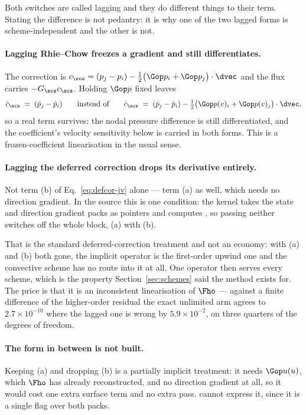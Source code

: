 Both switches are called lagging and they do different things to their term. Stating the
difference is not pedantry: it is why one of the two lagged forms is scheme-independent and the
other is not.

\paragraph{Lagging Rhie--Chow freezes a gradient and still differentiates.} The correction is
$c_\scs = (p_j - p_i) - \tfrac12\bigl(\Gop p_i + \Gop p_j\bigr)\cdot\dvec$ and the flux carries
$-G_\scs c_\scs$. Holding $\Gop p$ fixed leaves
\begin{equation}
\dot{c}_\scs \;=\; (\dot{p}_j - \dot{p}_i)
\qquad\text{instead of}\qquad
\dot{c}_\scs \;=\; (\dot{p}_j - \dot{p}_i)
  - \tfrac12\bigl(\Gop p(v)_i + \Gop p(v)_j\bigr)\cdot\dvec ,
\end{equation}
so a real term survives: the nodal pressure difference is still differentiated, and the
coefficient's velocity sensitivity below is carried in both forms. This is a frozen-coefficient
linearisation in the usual sense.

\paragraph{Lagging the deferred correction drops its derivative entirely.} Not term (b) of
Eq.~\eqref{eq:defcor-jv} alone --- term (a) as well, which needs no direction gradient. In the
source this is one condition: the kernel takes the state and direction gradient packs as
pointers and computes , so passing
neither switches off the whole  block, (a) with (b).

That is the standard deferred-correction treatment and not an economy: with (a) and (b) both
gone, the implicit operator is the first-order upwind one and the convective scheme has no route
into it at all. One operator then serves every scheme, which is the property
Section~\ref{sec:schemes} said the method exists for. The price is that it is an inconsistent
linearisation of $\Fho$ --- against a finite difference of the higher-order residual the exact
unlimited arm agrees to $2.7\times10^{-10}$ where the lagged one is wrong by
$5.9\times10^{-2}$, on three quarters of the degrees of freedom.

\paragraph{The form in between is not built.} Keeping (a) and dropping (b) is a partially implicit
treatment: it needs $\Gop u(u)$, which $\Fho$ has already reconstructed, and no direction gradient
at all, so it would cost one extra surface term and no extra pass.  cannot express
it, since it is a single flag over both packs.

